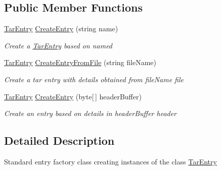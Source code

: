 \subsection*{Public Member Functions}
\begin{DoxyCompactItemize}
\item 
\hyperlink{class_i_c_sharp_code_1_1_sharp_zip_lib_1_1_tar_1_1_tar_entry}{Tar\+Entry} \hyperlink{class_i_c_sharp_code_1_1_sharp_zip_lib_1_1_tar_1_1_tar_input_stream_1_1_entry_factory_adapter_ae6f5f3df4f39bc1f87f2307d32a5ca04}{Create\+Entry} (string name)
\begin{DoxyCompactList}\small\item\em Create a \hyperlink{class_i_c_sharp_code_1_1_sharp_zip_lib_1_1_tar_1_1_tar_entry}{Tar\+Entry} based on named \end{DoxyCompactList}\item 
\hyperlink{class_i_c_sharp_code_1_1_sharp_zip_lib_1_1_tar_1_1_tar_entry}{Tar\+Entry} \hyperlink{class_i_c_sharp_code_1_1_sharp_zip_lib_1_1_tar_1_1_tar_input_stream_1_1_entry_factory_adapter_ac36b2a846d3148d82ebba5cc1db97ad7}{Create\+Entry\+From\+File} (string file\+Name)
\begin{DoxyCompactList}\small\item\em Create a tar entry with details obtained from {\itshape file\+Name} file \end{DoxyCompactList}\item 
\hyperlink{class_i_c_sharp_code_1_1_sharp_zip_lib_1_1_tar_1_1_tar_entry}{Tar\+Entry} \hyperlink{class_i_c_sharp_code_1_1_sharp_zip_lib_1_1_tar_1_1_tar_input_stream_1_1_entry_factory_adapter_a1d1d5f14b5bef37cc2f8a999316ca5fd}{Create\+Entry} (byte\mbox{[}$\,$\mbox{]} header\+Buffer)
\begin{DoxyCompactList}\small\item\em Create an entry based on details in {\itshape header\+Buffer} header \end{DoxyCompactList}\end{DoxyCompactItemize}


\subsection{Detailed Description}
Standard entry factory class creating instances of the class \hyperlink{class_i_c_sharp_code_1_1_sharp_zip_lib_1_1_tar_1_1_tar_entry}{Tar\+Entry} 



